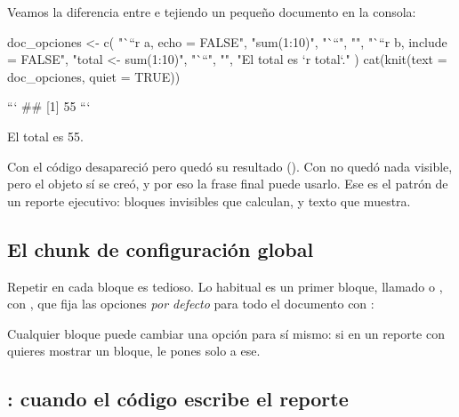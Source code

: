 Veamos la diferencia entre  e 
tejiendo un pequeño documento en la consola:

\begin{rcode}
doc_opciones <- c(
  "```{r a, echo = FALSE}",
  "sum(1:10)",
  "```",
  "",
  "```{r b, include = FALSE}",
  "total <- sum(1:10)",
  "```",
  "",
  "El total es `r total`."
)
cat(knit(text = doc_opciones, quiet = TRUE))
\end{rcode}
\begin{rsalida}

```
## [1] 55
```



El total es 55.
\end{rsalida}

Con  el código desapareció pero quedó su resultado
(). Con  no quedó nada visible,
pero el objeto  sí se creó, y por eso la frase final puede
usarlo. Ese es el patrón de un reporte ejecutivo: bloques invisibles que
calculan, y texto que muestra.

\subsection{El chunk de configuración global}

Repetir  en cada bloque es tedioso.
Lo habitual es un primer bloque, llamado  o
, con , que fija las opciones
\emph{por defecto} para todo el documento con
:


Cualquier bloque puede cambiar una opción para sí mismo: si en un reporte
con  quieres mostrar un bloque, le pones
 solo a ese.

\subsection{\texorpdfstring{}{results = "asis"}:
cuando el código escribe el reporte}

